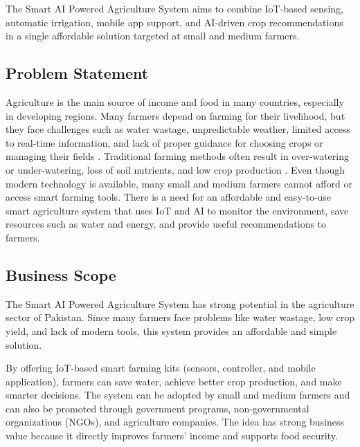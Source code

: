 The Smart AI Powered Agriculture System aims to combine IoT-based 
sensing, automatic irrigation, mobile app support, and AI-driven 
crop recommendations in a single affordable solution targeted at 
small and medium farmers.

\subsection{Problem Statement}

Agriculture is the main source of income and food in many countries, 
especially in developing regions. Many farmers depend on farming for 
their livelihood, but they face challenges such as water wastage, 
unpredictable weather, limited access to real-time information, and 
lack of proper guidance for choosing crops or managing their fields 
\cite{shafi2019precision}. Traditional farming methods often result 
in over-watering or under-watering, loss of soil nutrients, and low 
crop production \cite{garcia2020iot}. Even though modern technology 
is available, many small and medium farmers cannot afford or access 
smart farming tools. There is a need for an affordable and 
easy-to-use smart agriculture system that uses IoT and AI to monitor 
the environment, save resources such as water and energy, and provide 
useful recommendations to farmers.

\subsection{Business Scope}

The Smart AI Powered Agriculture System has strong potential in the 
agriculture sector of Pakistan. Since many farmers face problems like 
water wastage, low crop yield, and lack of modern tools, this system 
provides an affordable and simple solution.

By offering IoT-based smart farming kits (sensors, controller, and 
mobile application), farmers can save water, achieve better crop 
production, and make smarter decisions. The system can be adopted by 
small and medium farmers and can also be promoted through government 
programs, non-governmental organizations (NGOs), and agriculture 
companies. The idea has strong business value because it directly 
improves farmers' income and supports food security.

